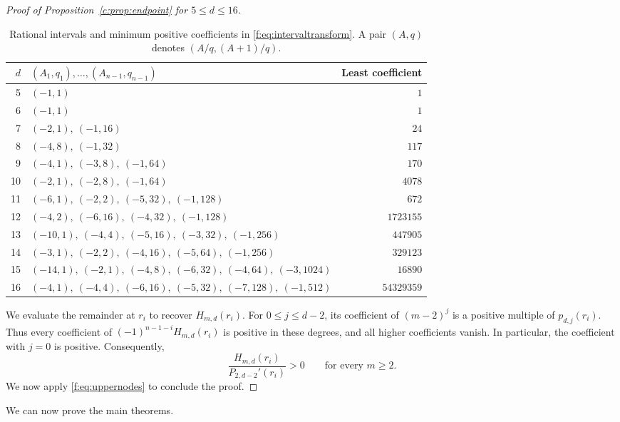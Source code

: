 \documentclass[10pt,a4paper]{article}
\numberwithin{equation}{section}
\theoremstyle{remark}\newtheorem{remark}[theorem]{Remark}
\begin{document}
\begin{proof}[Proof of Proposition~\ref{c:prop:endpoint} for $5\le d\le16$]
\begin{table}[htbp]
\centering
\small
\setlength{\tabcolsep}{5pt}
\caption{Rational intervals and minimum positive coefficients in
\eqref{f:eq:intervaltransform}. A pair $(A,q)$ denotes $(A/q,(A+1)/q)$.}
\label{tab:intervals}
\begin{tabular}{@{}r l r@{}}
\toprule
$d$ & $(A_1,q_1),\ldots,(A_{n-1},q_{n-1})$ & Least coefficient\\
\midrule
5 & $(-1,1)$ & $1$\\
6 & $(-1,1)$ & $1$\\
7 & $(-2,1),\ (-1,16)$ & $24$\\
8 & $(-4,8),\ (-1,32)$ & $117$\\
9 & $(-4,1),\ (-3,8),\ (-1,64)$ & $170$\\
10 & $(-2,1),\ (-2,8),\ (-1,64)$ & $4078$\\
11 & $(-6,1),\ (-2,2),\ (-5,32),\ (-1,128)$ & $672$\\
12 & $(-4,2),\ (-6,16),\ (-4,32),\ (-1,128)$ & $1723155$\\
13 & $(-10,1),\ (-4,4),\ (-5,16),\ (-3,32),\ (-1,256)$ & $447905$\\
14 & $(-3,1),\ (-2,2),\ (-4,16),\ (-5,64),\ (-1,256)$ & $329123$\\
15 & $(-14,1),\ (-2,1),\ (-4,8),\ (-6,32),\ (-4,64),\ (-3,1024)$ & $16890$\\
16 & $(-4,1),\ (-4,4),\ (-6,16),\ (-5,32),\ (-7,128),\ (-1,512)$ & $54329359$\\
\bottomrule
\end{tabular}
\end{table}

We evaluate the remainder at $r_i$ to recover $H_{m,d}(r_i)$.
For $0\le j\le d-2$, its coefficient of $(m-2)^j$ is a positive
multiple of $p_{d,j}(r_i)$. Thus every coefficient of
$(-1)^{n-1-i}H_{m,d}(r_i)$ is positive in these degrees, and all
higher coefficients vanish. In particular, the coefficient with $j=0$ is positive.
Consequently,
\[
 \frac{H_{m,d}(r_i)}{P_{2,d-2}'(r_i)}>0
 \qquad\text{for every }m\ge2.
\]
We now apply \eqref{f:eq:uppernodes} to conclude the proof.
\end{proof}

\FloatBarrier
We can now prove the main theorems.
\end{document}
